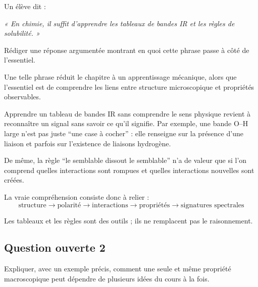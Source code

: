 \documentclass[11pt,a4paper]{article}
\begin{document}
\begin{enoncebox}
Un élève dit :

\begin{center}
\textit{« En chimie, il suffit d'apprendre les tableaux de bandes IR et les règles de solubilité. »}
\end{center}

Rédiger une réponse argumentée montrant en quoi cette phrase passe à côté de l'essentiel.
\end{enoncebox}

\begin{corrigebox}
Une telle phrase réduit le chapitre à un apprentissage mécanique, alors que l'essentiel est de comprendre les liens entre structure microscopique et propriétés observables.

Apprendre un tableau de bandes IR sans comprendre le sens physique revient à reconnaître un signal sans savoir ce qu'il signifie.  
Par exemple, une bande O--H large n'est pas juste ``une case à cocher'' : elle renseigne sur la présence d'une liaison et parfois sur l'existence de liaisons hydrogène.

De même, la règle ``le semblable dissout le semblable'' n'a de valeur que si l'on comprend quelles interactions sont rompues et quelles interactions nouvelles sont créées.

La vraie compréhension consiste donc à relier :
\[
\text{structure} \longrightarrow \text{polarité} \longrightarrow \text{interactions} \longrightarrow \text{propriétés} \longrightarrow \text{signatures spectrales}
\]

Les tableaux et les règles sont des outils ; ils ne remplacent pas le raisonnement.
\end{corrigebox}

\subsection{Question ouverte 2}

\begin{enoncebox}
Expliquer, avec un exemple précis, comment une seule et même propriété macroscopique peut dépendre de plusieurs idées du cours à la fois.
\end{enoncebox}
\end{document}
